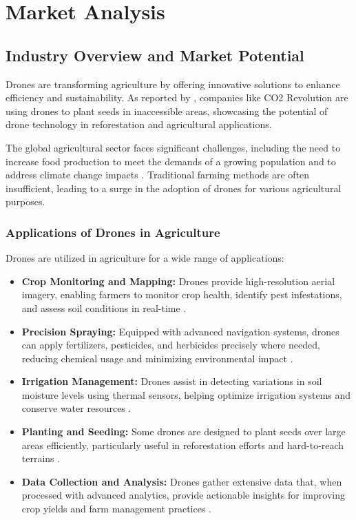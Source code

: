\chapter{Market Analysis}

\section{Industry Overview and Market Potential}

Drones are transforming agriculture by offering innovative solutions to enhance efficiency and sustainability. As reported by \citet{chaundler2021}, companies like CO2 Revolution are using drones to plant seeds in inaccessible areas, showcasing the potential of drone technology in reforestation and agricultural applications.

The global agricultural sector faces significant challenges, including the need to increase food production to meet the demands of a growing population and to address climate change impacts \citep{nazarov2023}. Traditional farming methods are often insufficient, leading to a surge in the adoption of drones for various agricultural purposes.

\subsection{Applications of Drones in Agriculture}

Drones are utilized in agriculture for a wide range of applications:

\begin{itemize} \item \textbf{Crop Monitoring and Mapping:} Drones provide high-resolution aerial imagery, enabling farmers to monitor crop health, identify pest infestations, and assess soil conditions in real-time \citep{nazarov2023, alliedmarketresearch2021}. \item \textbf{Precision Spraying:} Equipped with advanced navigation systems, drones can apply fertilizers, pesticides, and herbicides precisely where needed, reducing chemical usage and minimizing environmental impact \citep{guardianagriculture, plantdiseasedetection2023}. \item \textbf{Irrigation Management:} Drones assist in detecting variations in soil moisture levels using thermal sensors, helping optimize irrigation systems and conserve water resources \citep{nazarov2023}. \item \textbf{Planting and Seeding:} Some drones are designed to plant seeds over large areas efficiently, particularly useful in reforestation efforts and hard-to-reach terrains \citep{chaundler2021}. \item \textbf{Data Collection and Analysis:} Drones gather extensive data that, when processed with advanced analytics, provide actionable insights for improving crop yields and farm management practices \citep{lin2023}. \end{itemize}

